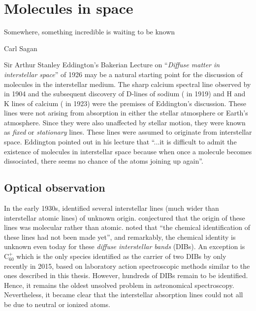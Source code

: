 \section{Molecules in space}
\label{sec:intro:ions_in_space}

\epigraph{Somewhere, something incredible is waiting to be known}{Carl Sagan}
Sir Arthur Stanley Eddington's Bakerian Lecture on \enquote{\emph{Diffuse matter in interstellar space}} \cite{eddington_bakerian_1926} of 1926 may be a natural starting point for the discussion of molecules in the interstellar medium. The sharp calcium spectral line observed by \citet{hartmann_investigations_1904} in 1904 and the subsequent discovery of D-lines of sodium (\citet{heger_occurrence_1919} in 1919) and H and K lines of calcium (\citet{plaskett_h_1923} in 1923) were the premises of Eddington's discussion. These lines were not arising from absorption in either the stellar atmosphere or Earth's atmosphere. Since they were also unaffected by stellar motion, they were known as \emph{fixed} or \emph{stationary} lines. These lines were assumed to originate from interstellar space. Eddington pointed out in his lecture that \enquote{...it is difficult to admit the existence of molecules in interstellar space because when once a molecule becomes dissociated, there seems no chance of the atoms joining up again}. 

\subsection{Optical observation}
\label{subsec:intro:optical}

In the early 1930s, \citet{merrill_unidentified_1934} identified several interstellar lines (much wider than interstellar atomic lines) of unknown origin. \citet{russell_analysis_1935} conjectured that the origin of these lines was molecular rather than atomic. \citet{merrill_stationary_1936} noted that \enquote{the chemical identification of these lines had not been made yet}, and remarkably, the chemical identity is unknown even today for these \emph{diffuse interstellar bands} (DIBs). An exception is C$_{60}^+$ which is the only species identified as the carrier of two DIBs by \citet{campbell_laboratory_2015} only recently in 2015, based on laboratory action spectroscopic methods similar to the ones described in this thesis. However, hundreds of DIBs remain to be identified. Hence, it remains the oldest unsolved problem in astronomical spectroscopy. Nevertheless, it became clear that the interstellar absorption lines could not all be due to neutral or ionized atoms.

